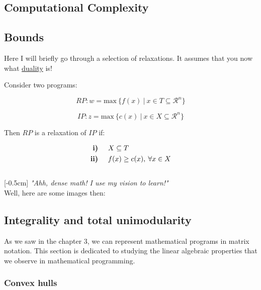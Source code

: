\subsection{Computational Complexity}

\subsection{Bounds}

Here I will briefly go through a selection of relaxations. It assumes that you
now what \hyperref[sec:duality]{duality} is!

Consider two programs:

\begin{equation}
RP: w = \mathrm{max}\: \{f(x)\:|\:x\in T \subseteq \mathcal{R}^n\}
\end{equation}

\begin{equation}
IP: z = \mathrm{max}\: \{c(x)\:|\:x\in X \subseteq \mathcal{R}^n\}
\end{equation}

Then $RP$ is a relaxation of $IP$ if:

\begin{equation}
\begin{split}
\text{\textbf{i)}\hspace{0.5cm}}  & X \subseteq T\\
\text{\textbf{ii)}\hspace{0.5cm}} & f(x) \geq c(x),\: \forall x\in X
\end{split}
\end{equation}\\

[-0.5cm]
\textit{"Ahh, dense math! I use my vision to learn!"}\\
Well, here are some images then:\\

\subsection{Integrality and total unimodularity}

As we saw in the chapter 3, we can represent mathematical programs in matrix
notation. This section is dedicated to studying the linear algebraic properties
that we observe in mathematical programming.

\subsubsection{Convex hulls}

